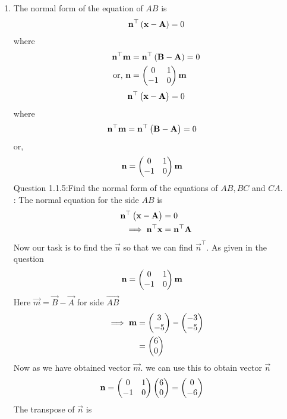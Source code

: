 \documentclass[11pt]{book}
\begin{document}
\begin{enumerate}[label=\thesection.\arabic*.,ref=\thesection.\theenumi]
\item The normal form of the equation of $AB$  is 
		\begin{align}
			\mathbf{n}^{\top}\left(	\mathbf{x}-\mathbf{A}\right) = 0
		\end{align}
		where 
		\begin{align}
			\mathbf{n}^{\top}\mathbf{m}&=\mathbf{n}^{\top}\left(\mathbf{B}-\mathbf{A}\right) = 0
			\\
			\text{or, } \mathbf{n}&=\begin{pmatrix}0 & 1 \\ -1 & 0\end{pmatrix} \mathbf{m}
		\end{align}
  \begin{align}
\mathbf{n}^{\top}\begin{pmatrix}\mathbf{x}-\mathbf{A}\end{pmatrix}=0
\end{align}
where
\begin{align}
\mathbf{n}^{\top}\mathbf{m}&=\mathbf{n}^{\top}\begin{pmatrix}\mathbf{B}-\mathbf{A}\end{pmatrix}=0
\end{align}	
or,\begin{align}
\mathbf{n}&=\begin{pmatrix}0 &1 \\-1 & 0\end{pmatrix}\mathbf{m}
\end{align}
Question 1.1.5:Find the normal form of the equations of $AB, BC$ and $CA$.\\
\solution:
       The normal equation for the side $AB$ is
\begin{align}
\mathbf{n}^{\top}\begin{pmatrix}\mathbf{x}-\mathbf{A}\end{pmatrix}&=0\\
\implies
\mathbf{n}^{\top}\mathbf{x}&=\mathbf{n}^{\top}\mathbf{A}
\end{align}
Now our task is to find the $\vec{n}$ so that we can find $\vec{n}^{\top}$.
As given in the question 
\begin{align}
  \mathbf{n} &= \begin{pmatrix}0 & 1\\
  -1 & 0\end{pmatrix}\mathbf{m}
\end{align}
Here $\vec{m} = \vec{B}- \vec{A}$ for side $\vec{AB}$
\begin{align}
\implies
\mathbf{m}&=\begin{pmatrix}3\\-5\end{pmatrix} - \begin{pmatrix}-3\\-5\end{pmatrix}\\
&=\begin{pmatrix}6\\0\end{pmatrix}
\end{align}
Now as we have obtained vector $\vec{m}$.
we can use this to obtain vector $\vec{n}$
\begin{align}
\mathbf{n} &= \begin{pmatrix}0 & 1\\
  -1 & 0\end{pmatrix}\begin{pmatrix}6\\0\end{pmatrix}
 = \begin{pmatrix}0\\-6\end{pmatrix}
\end{align}
The transpose of $\vec{n}$ is
\begin{align}

\end{align}
\end{enumerate}
\end{document}
